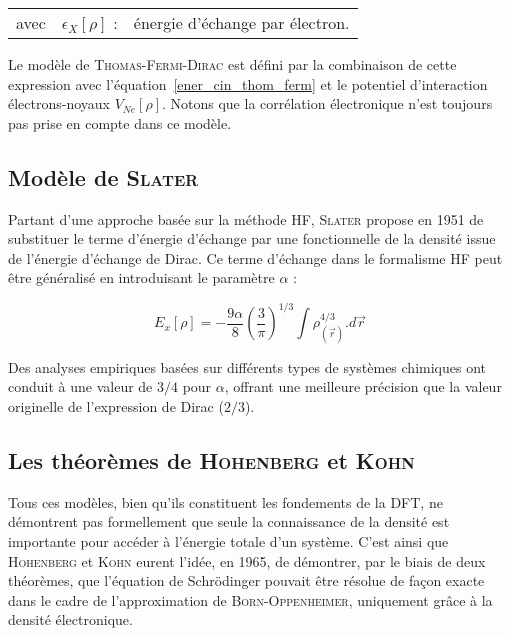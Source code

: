 \documentclass[12pt,a4paper]{book}
\begin{document}
	\begin{flushleft}
		\begin{tabular}{@{}lrp{10cm}}
			avec & $\epsilon_{X}[\rho]$ : & énergie d'échange par électron. 
		\end{tabular}
	\end{flushleft}
	
	Le modèle de \textsc{Thomas-Fermi-Dirac} est défini par la combinaison de cette expression avec l'équation~\ref{ener_cin_thom_ferm} et le potentiel d'interaction électrons-noyaux $V_{Ne}[\rho]$. Notons que la corrélation électronique n'est toujours pas prise en compte dans ce modèle.
	
	
	\subsection{Modèle de \textsc{Slater}}
	
	Partant d'une approche basée sur la méthode HF, \textsc{Slater} propose en 1951 de substituer le terme d'énergie d'échange par une fonctionnelle de la densité issue de l'énergie d'échange de Dirac. Ce terme d'échange dans le formalisme HF peut être généralisé en introduisant le paramètre $\alpha$ :
	
	\begin{equation}
	E_{x}[\rho] = - \frac{9\alpha}{8} \left(\frac{3}{\pi}\right)^{1/3} \int \rho_{(\vec{r})}^{4/3} .d\vec{r}
	\end{equation}
	
	Des analyses empiriques basées sur différents types de systèmes chimiques ont conduit à une valeur de $3/4$ pour $\alpha$, offrant une meilleure précision que la valeur originelle de l'expression de Dirac ($2/3$).
	
	\subsection{Les théorèmes de \textsc{Hohenberg} et \textsc{Kohn}}
	
	Tous ces modèles, bien qu'ils constituent les fondements de la DFT, ne démontrent pas formellement que seule la connaissance de la densité est importante pour accéder à l'énergie totale d'un système. C'est ainsi que \textsc{Hohenberg} et \textsc{Kohn} eurent l'idée, en 1965, de démontrer, par le biais de deux théorèmes, que l'équation de Schr\"{o}dinger pouvait être résolue de façon exacte dans le cadre de l'approximation de \textsc{Born-Oppenheimer}, uniquement grâce à la densité électronique.
	
\end{document}
